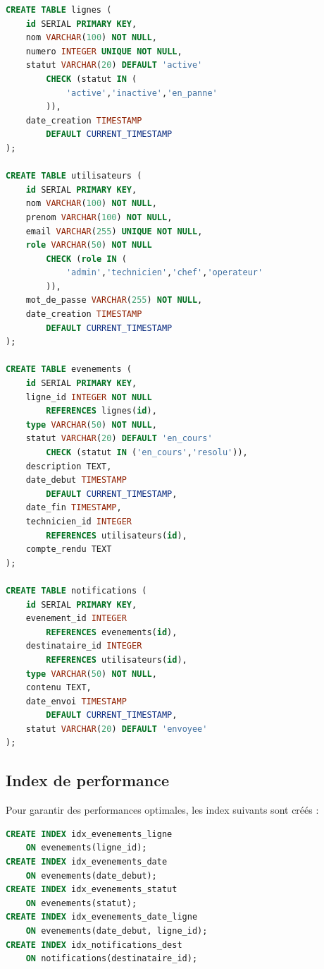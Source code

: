 \begin{lstlisting}[language=SQL,caption={Cr\'eation des tables principales},label={lst:create_tables}]
CREATE TABLE lignes (
    id SERIAL PRIMARY KEY,
    nom VARCHAR(100) NOT NULL,
    numero INTEGER UNIQUE NOT NULL,
    statut VARCHAR(20) DEFAULT 'active' 
        CHECK (statut IN (
            'active','inactive','en_panne'
        )),
    date_creation TIMESTAMP 
        DEFAULT CURRENT_TIMESTAMP
);

CREATE TABLE utilisateurs (
    id SERIAL PRIMARY KEY,
    nom VARCHAR(100) NOT NULL,
    prenom VARCHAR(100) NOT NULL,
    email VARCHAR(255) UNIQUE NOT NULL,
    role VARCHAR(50) NOT NULL
        CHECK (role IN (
            'admin','technicien','chef','operateur'
        )),
    mot_de_passe VARCHAR(255) NOT NULL,
    date_creation TIMESTAMP 
        DEFAULT CURRENT_TIMESTAMP
);

CREATE TABLE evenements (
    id SERIAL PRIMARY KEY,
    ligne_id INTEGER NOT NULL 
        REFERENCES lignes(id),
    type VARCHAR(50) NOT NULL,
    statut VARCHAR(20) DEFAULT 'en_cours'
        CHECK (statut IN ('en_cours','resolu')),
    description TEXT,
    date_debut TIMESTAMP 
        DEFAULT CURRENT_TIMESTAMP,
    date_fin TIMESTAMP,
    technicien_id INTEGER 
        REFERENCES utilisateurs(id),
    compte_rendu TEXT
);

CREATE TABLE notifications (
    id SERIAL PRIMARY KEY,
    evenement_id INTEGER 
        REFERENCES evenements(id),
    destinataire_id INTEGER 
        REFERENCES utilisateurs(id),
    type VARCHAR(50) NOT NULL,
    contenu TEXT,
    date_envoi TIMESTAMP 
        DEFAULT CURRENT_TIMESTAMP,
    statut VARCHAR(20) DEFAULT 'envoyee'
);
\end{lstlisting}

\subsection{Index de performance}

Pour garantir des performances optimales, les index suivants sont cr\'e\'es :

\begin{lstlisting}[language=SQL,caption={Index de performance},label={lst:indexes}]
CREATE INDEX idx_evenements_ligne 
    ON evenements(ligne_id);
CREATE INDEX idx_evenements_date 
    ON evenements(date_debut);
CREATE INDEX idx_evenements_statut 
    ON evenements(statut);
CREATE INDEX idx_evenements_date_ligne 
    ON evenements(date_debut, ligne_id);
CREATE INDEX idx_notifications_dest 
    ON notifications(destinataire_id);
\end{lstlisting}

